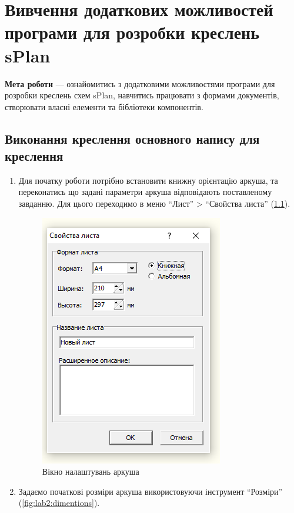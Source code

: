 \chapter[~]{Вивчення додаткових можливостей програми для розробки креслень sPlan}

\textbf{Мета роботи} --- ознайомитись з додатковими можливостями програми для розробки креслень схем
sPlan, навчитись працювати з формами документів, створювати власні елементи та бібліотеки
компонентів.

\section{Виконання креслення основного напису для креслення}

\begin{enumerate}[leftmargin=*]
\item Для початку роботи потрібно встановити книжну орієнтацію аркуша, та переконатись що задані
  параметри аркуша відповідають поставленому завданню. Для цього переходимо в меню ``Лист'' >
  ``Свойства листа'' (\ref{fig:lab2:document_settigns}).

  \begin{figure}[!ht]
    \centering \includegraphics[]{./images/lab2/document_settings.png}
    \caption{Вікно налаштувань аркуша}
    \label{fig:lab2:document_settigns} 
  \end{figure}

  \newpage

\item Задаємо початкові розміри аркуша використовуючи інструмент
  ``Розміри'' (\ref{fig:lab2:dimentions}).
  

\end{enumerate}

